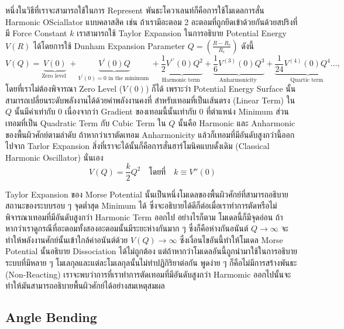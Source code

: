 หนึ่งในวิธีที่เราจะสามารถใช้ในการ Represent พันธะโควาเลนท์ก็คือการใช้โมเดลการสั่น Harmonic OSciallator แบบคลาสสิค เช่น ถ้าเรามีอะตอม 2 อะตอมที่ถูกยึดเข้าด้วยกันด้วยสปริงที่มี Force Constant $k$ เราสามารถใช้ Taylor Expansion ในการอธิบาย Potential Energy $V(R)$ ได้โดยการใช้ Dunham Expansion Parameter $Q = (\frac{R-R_{e}}{R_{e}})$ ดังนี้
%
\begin{equation}
  V(Q)
  =
  \underbrace{V(0)}_{\text{Zero level }}
  + \underbrace{V^{\prime}(0) Q}_{V^{\prime}(0)=0 \text{ in the minimum }}
  + \underbrace{\frac{1}{2} V^{\prime \prime}(0) Q^2}_{\text{Harmonic term }}
  + \underbrace{\frac{1}{6} V^{(3)}(0) Q^3}_{\text{Anharmonicity }}
  + \underbrace{\frac{1}{24} V^{(4)}(0) Q^4 \ldots,}_{\text{Quartic term }}
\end{equation}
%
โดยที่เราไม่ต้องพิจารณา Zero Level ($V(0)$) ก็ได้ เพราะว่า Potential Energy Surface นั้นสามารถเปลี่ยนระดับพลังงานได้ด้วยค่าพลังงานคงที่ สำหรับเทอมที่เป็นเส้นตรง (Linear Term) ใน $Q$ นั้นมีค่าเท่ากับ 0 เนื่องจากว่า Gradient ของเทอมนี้นั้นเท่ากับ 0 ที่ตำแหน่ง Minimum ส่วนเทอมที่เป็น Quadratic Term กับ Cubic Term ใน $Q$ นั้นคือ Harmonic และ Anharmonic ของพื้นผิวศักย์ตามลำดับ ถ้าหากว่าเราตัดเทอม Anharmonicity แล้วก็เทอมที่มีอันดับสูงกว่านี้ออกไปจาก Tarlor Expansion สิ่งที่เราจะได้นั้นก็คือการสั่นฮาร์โมนิคแบบดั้งเดิม (Classical Harmonic Oscillator) นั่นเอง
%
\begin{equation}
  V(Q)
  =
  \frac{k}{2} Q^{2} \quad \text{โดยที่} \quad k \equiv V''(0)
\end{equation}

Taylor Expansion ของ Morse Potential นั้นเป็นหนึ่งโมเดลของพื้นผิวศักย์ที่สามารถอธิบายสถานะของระบบรอบ ๆ จุดต่ำสุด Minimum ได้ ซึ่งจะอธิบายได้ดีก็ต่อเมื่อเราทำการตัดหรือไม่พิจารณาเทอมที่มีอันดับสูงกว่า Harmonic Term ออกไป อย่างไรก็ตาม โมเดลนี้ก็มีจุดอ่อน ถ้าหากว่าเราดูกรณีที่อะตอมทั้งสองอะตอมนั้นมีระยะห่างกันมาก ๆ ซึ่งก็คือห่างกันอนันต์ $Q \rightarrow \infty$ จะทำให้พลังงานศักย์นั้นเข้าใกล้ค่าอนันต์ด้วย $V(Q) \rightarrow \infty$ ซึ่งเงื่อนไขอันนี้ทำให้โมเดล Morse Potential นั้นอธิบาย Dissociation ได้ไม่ถูกต้อง แต่ถ้าหากว่าโมเดลอันนี้ถูกนำมาใช้ในการอธิบายระบบที่มีหลาย ๆ โมเลกุลและแต่ละโมเลกุลนั้นไม่ทำปฏิกิริยาต่อกัน พูดง่าย ๆ ก็คือไม่มีการสร้างพันธะ (Non-Reacting) เราจะพบว่าการที่เราทำการตัดเทอมที่มีอันดับสูงกว่า Harmomic ออกไปนั้นจะทำให้มันสามารถอธิบายพื้นผิวศักย์ได้อย่างสมเหตุสมผล

\subsection{Angle Bending}

